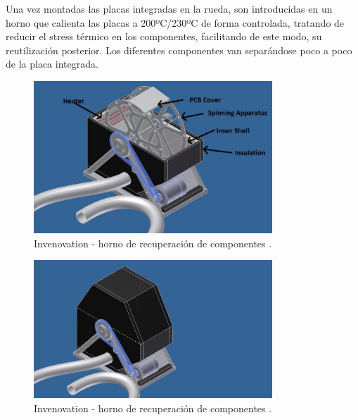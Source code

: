 Una vez montadas las placas integradas en la rueda, son introducidas en un horno que calienta las placas a 200ºC/230ºC de forma controlada, tratando de reducir el stress térmico en los componentes, facilitando de este modo, su reutilización posterior. Los diferentes componentes van separándose poco a poco de la placa integrada.

\begin{figure}[H]
\begin{center}
\includegraphics[width=0.8\textwidth]{img/D3}
\caption{Invenovation - horno de recuperación de componentes \cite{invenovation}.}
\end{center}
\end{figure}

\begin{figure}[H]
\begin{center}
\includegraphics[width=0.8\textwidth]{img/D4}
\caption{Invenovation - horno de recuperación de componentes \cite{invenovation}.}
\end{center}
\end{figure}

